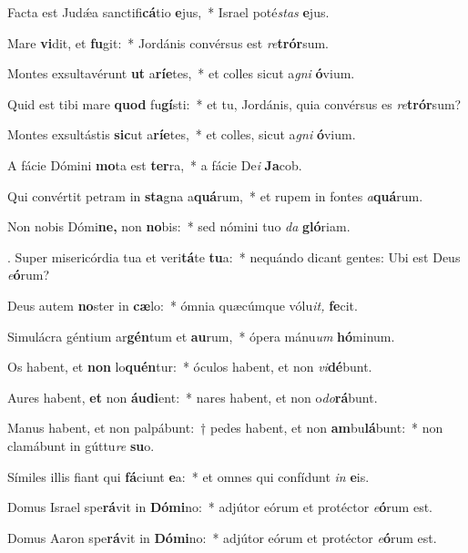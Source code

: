 \item Facta est Judǽa sanctifi\textbf{cá}tio \textbf{e}jus,~* Israel poté\textit{stas} \textbf{e}jus.
\item Mare \textbf{vi}dit, et \textbf{fu}git:~* Jordánis convérsus est \textit{re}\textbf{trór}sum.
\item Montes exsultavérunt \textbf{ut} a\textbf{rí}\textbf{e}tes,~* et colles sicut a\textit{gni} \textbf{ó}vium.
\item Quid est tibi mare \textbf{quod} fu\textbf{gí}sti:~* et tu, Jordánis, quia convérsus es \textit{re}\textbf{trór}sum?
\item Montes exsultástis \textbf{sic}ut a\textbf{rí}\textbf{e}tes,~* et colles, sicut a\textit{gni} \textbf{ó}vium.
\item A fácie Dómini \textbf{mo}ta est \textbf{ter}ra,~* a fácie De\textit{i} \textbf{Ja}cob.
\item Qui convértit petram in \textbf{sta}gna a\textbf{quá}rum,~* et rupem in fontes \textit{a}\textbf{quá}rum.
\item Non nobis Dómi\textbf{ne,} non \textbf{no}bis:~* sed nómini tuo \textit{da} \textbf{gló}riam.
\item. Super misericórdia tua et veri\textbf{tá}te \textbf{tu}a:~* nequándo dicant gentes: Ubi est Deus \textit{e}\textbf{ó}rum?
\item Deus autem \textbf{no}ster in \textbf{cæ}lo:~* ómnia quæcúmque vólu\textit{it,} \textbf{fe}cit.
\item Simulácra géntium ar\textbf{gén}tum et \textbf{au}rum,~* ópera mánu\tinyhspace\textit{um} \textbf{hó}minum.
\item Os habent, et \textbf{non} lo\textbf{quén}tur:~* óculos habent, et non \textit{vi}\textbf{dé}bunt.
\item Aures habent, \textbf{et} non \textbf{áu}\textbf{di}ent:~* nares habent, et non o\textit{do}\textbf{rá}bunt.
\item Manus habent, et non palpábunt:~† pedes habent, et non \textbf{am}bu\textbf{lá}bunt:~* non clamábunt in gúttu\textit{re} \textbf{su}o.
\item Símiles illis fiant qui \textbf{fá}ciunt \textbf{e}a:~* et omnes qui confídunt \textit{in} \textbf{e}is.
\item Domus Israel spe\textbf{rá}vit in \textbf{Dó}\textbf{mi}no:~* adjútor eórum et protéctor \textit{e}\textbf{ó}rum est.
\item Domus Aaron spe\textbf{rá}vit in \textbf{Dó}\textbf{mi}no:~* adjútor eórum et protéctor \textit{e}\textbf{ó}rum est.
